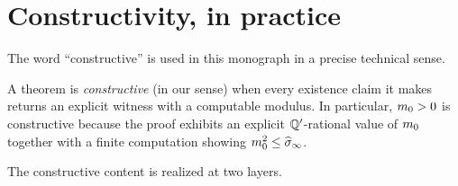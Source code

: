 \begin{mainfigure}[!htbp]
\caption{Proof-composition flow, with the machine-checked /
paper-level split made explicit.  \emph{Top lane (green, solid)}: the
$\Qp$-rational spine --- the per-step budget, its closure
$\sum_k \etak < \sigma_0 \Rightarrow \sighinf \ge \varepsilon$, and the
decidable arithmetic $\massgap^2 \le \sighinf$ --- is fully formalized
in Lean (axiom-free, or \codepath{[propext]}-only).  \emph{Bottom lane
(amber, dashed)}: the analytic bundle each step composes against ---
the Kotecký--Preiss certificates, the Daniell--Kolmogorov projective
limit with the OS axioms, and the operator-theoretic reconstruction
(Stone) with the area-law--to--gap $\sqrt{\sighinf}$ bridge --- is
supplied at the paper level against Lean type-signature interfaces.
The dashed arrows mark which analytic input each $\Qp$-data step
assumes; steps (1)--(3) are the three constructions of
\S\ref{sec:proof-one-paragraph}.}
\label{fig:proof-composition}
\end{mainfigure}

\section{Constructivity, in practice}
\label{sec:constructivity}

%
The word ``constructive'' is used in this monograph in a precise
technical sense.

\begin{notation}
A theorem is \emph{constructive} (in our sense) when every
existence claim it makes returns an explicit witness with a
computable modulus.  In particular, $m_0 > 0$ is constructive
because the proof exhibits an explicit $\Qp$-rational value of
$m_0$ together with a finite computation showing
$\massgap^2 \le \sighinf$.
\end{notation}

The constructive content is realized at two layers.

